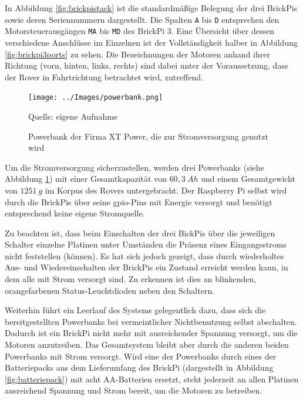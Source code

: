 In Abbildung \ref{fig:brickpistack} ist die standardmäßige Belegung der drei BrickPis sowie deren Seriennummern dargestellt.
Die Spalten \texttt{A} bis \texttt{D} entsprechen den Motorsteuerausgängen \texttt{MA} bis \texttt{MD} des BrickPi 3.
Eine Übersicht über dessen verschiedene Anschlüsse im Einzelnen ist der Vollständigkeit halber in Abbildung \ref{fig:brickpi3ports} zu sehen.
Die Bezeichnungen der Motoren anhand ihrer Richtung (vorn, hinten, links, rechts) sind dabei unter der Voraussetzung, dass der Rover in Fahrtrichtung betrachtet wird, zutreffend.

\begin{figure}
	\centering
	\texttt{[image: ../Images/powerbank.png]}
	\vspace{0.5em}
	\parbox[c]{0.8\linewidth}{\footnotesize
		\centering
		\vspace{1em}
		Quelle: eigene Aufnahme
	}
	\captionsetup{format=plain}
	\caption{Powerbank der Firma XT Power, die zur Stromversorgung genutzt wird}
	\label{fig:powerbank}
\end{figure}

Um die Stromversorgung sicherzustellen, werden drei Powerbanks (siehe Abbildung \ref{fig:powerbank}) mit einer Gesamtkapazität von $60{,}3\ Ah$ und einem Gesamtgewicht von $1251\ g$ im Korpus des Rovers untergebracht.
Der Raspberry Pi selbst wird durch die BrickPis über seine \acs{gpio}-Pins mit Energie versorgt \cite{cole2013} und benötigt entsprechend keine eigene Stromquelle.

Zu beachten ist, dass beim Einschalten der drei BickPis über die jeweiligen Schalter einzelne Platinen unter Umständen die Präsenz eines Eingangsstroms nicht feststellen (können).
Es hat sich jedoch gezeigt, dass durch wiederholtes Aus- und Wiedereinschalten der BrickPis ein Zustand erreicht werden kann, in dem alle mit Strom versorgt sind.
Zu erkennen ist dies an blinkenden, orangefarbenen Status-Leuchtdioden neben den Schaltern.

Weiterhin führt ein Leerlauf des Systems gelegentlich dazu, dass sich die bereitgestellten Powerbanks bei vermeintlicher Nichtbenutzung selbst abschalten.
Dadurch ist ein BrickPi nicht mehr mit ausreichender Spannung versorgt, um die Motoren anzutreiben.
Das Gesamtsystem bleibt aber durch die anderen beiden Powerbanks mit Strom versorgt.
Wird eine der Powerbanks durch eines der Batteriepacks aus dem Lieferumfang des BrickPi (dargestellt in Abbildung \ref{fig:batteriepack}) mit acht AA-Batterien ersetzt, steht jederzeit an allen Platinen ausreichend Spannung und Strom bereit, um die Motoren zu betreiben.

